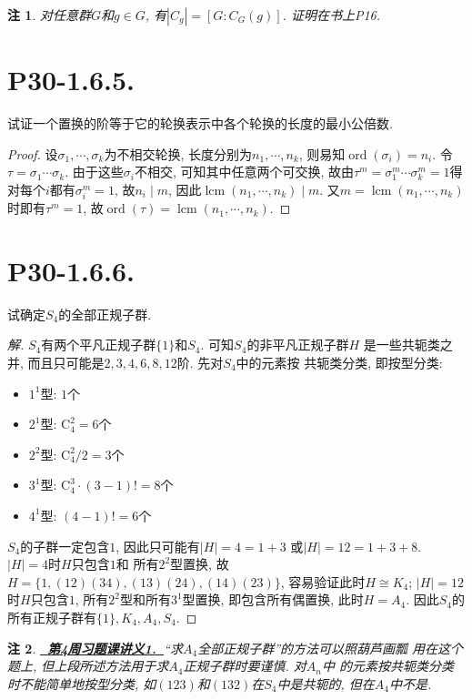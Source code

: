 \documentclass[12pt, a4paper, fontset=windows]{ctexart}
\newcommand{\abs}[1]{\left|{#1}\right|}
\newcommand{\isom}{\cong} %
\newcommand{\lcm}{\operatorname{lcm}}
\newcommand{\myref}[2][]{\hyperref[#1]{\bf\color{blue}\ {#2}\ }}
\newcommand{\ord}{\operatorname{ord}}
\newcommand{\yh}[1]{“{#1}”} %
\newtheorem*{remark}{注}
\newenvironment{solution}{\begin{proof}[解]}{\end{proof}}
\begin{document}
\begin{remark}
对任意群$G$和$g\in G$, 有$\abs{C_g}=[G:C_G(g)]$. 证明在书上P16. {\rm\cite{jsds}}
\end{remark}

\section*{P30-1.6.5.}

试证一个置换的阶等于它的轮换表示中各个轮换的长度的最小公倍数. 

\begin{proof}
设$\sigma_1,\cdots,\sigma_k$为不相交轮换, 长度分别为$n_1,\cdots,n_k$, 
则易知$\ord(\sigma_i)=n_i$. 令$\tau=\sigma_1\cdots\sigma_k$. 
由于这些$\sigma_i$不相交, 可知其中任意两个可交换, 
故由$\tau^m=\sigma_1^m\cdots\sigma_k^m=1$得
对每个$i$都有$\sigma_i^m=1$, 故$n_i\mid m$, 
因此$\lcm(n_1,\cdots,n_k)\mid m$. 又$m=\lcm(n_1,\cdots,n_k)$
时即有$\tau^m=1$, 故$\ord(\tau)=\lcm(n_1,\cdots,n_k)$. 
\end{proof}

\section*{P30-1.6.6.}

试确定$S_4$的全部正规子群. 

\begin{solution}
$S_4$有两个平凡正规子群$\{1\}$和$S_4$. 可知$S_4$的非平凡正规子群$H$
是一些共轭类之并, 而且只可能是$2,3,4,6,8,12$阶. 先对$S_4$中的元素按
共轭类分类, 即按型分类: 
\begin{itemize}[itemsep=0pt]
    \item $1^1$型: $1$个
    \item $2^1$型: $\mathrm{C}^2_4=6$个
    \item $2^2$型: $\mathrm{C}^2_4/2=3$个
    \item $3^1$型: $\mathrm{C}^3_4\cdot(3-1)!=8$个
    \item $4^1$型: $(4-1)!=6$个
\end{itemize}

$S_4$的子群一定包含$1$, 因此只可能有$\abs{H}=4=1+3$
或$\abs{H}=12=1+3+8$. $\abs{H}=4$时$H$只包含$1$和
所有$2^2$型置换, 故$H=\{1,(12)(34),
(13)(24),(14)(23)\}$, 容易验证此时$H\isom K_4$; 
$\abs{H}=12$时$H$只包含$1$, 所有$2^2$型和所有$3^1$型置换, 
即包含所有偶置换, 此时$H=A_4$. 
因此$S_4$的所有正规子群有$\{1\},K_4,A_4,S_4$. 
\end{solution}

\begin{remark}
\myref[A4-lhd]{第4周习题课讲义1.}\yh{求$A_4$全部正规子群}的方法可以照葫芦画瓢
用在这个题上, 但上段所述方法用于求$A_4$正规子群时要谨慎. 对$A_n$中
的元素按共轭类分类时不能简单地按型分类, 
如$(123)$和$(132)$在$S_4$中是共轭的, 但在$A_4$中不是. 
\end{remark}
\end{document}
